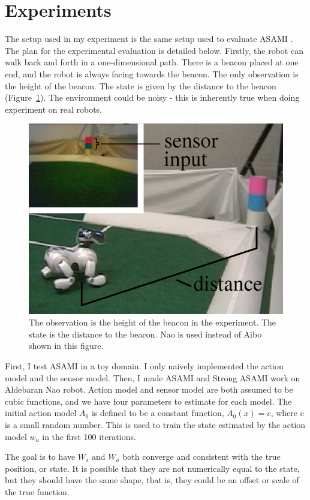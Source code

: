 \documentclass[12pt]{article}
\begin{document}
\section{Experiments}

The setup used in my experiment is the same setup used to evaluate
ASAMI \cite{CSJ06}. The
plan for the experimental evaluation is detailed below.
Firstly, the robot can walk back and forth in a one-dimensional path.
There is a beacon placed at one end, and the robot is always facing
towards the beacon. The only observation is the height of the beacon.
The state is given by the distance to the beacon
(Figure~\ref{fig:env}).  The environment could be noisy - this is
inherently true when doing experiment on real robots.

\begin{figure}
\centering
\includegraphics[width=0.6\columnwidth]{env.png}
\caption{The observation is the height of the beacon in the experiment.
The state is the distance to the beacon. Nao is used instead of Aibo
shown in this figure. \cite{CSJ06}}
\label{fig:env}
\end{figure}

First, I test ASAMI in a toy domain. I only naively implemented the action
model and the sensor model. Then, I made ASAMI and Strong ASAMI work on
Aldebaran Nao robot. Action model and sensor model are both assumed to be cubic
functions, and we have four parameters to estimate for each model. The
initial action model $A_0$ is defined to be a constant function,
$A_0(x) = c$, where c is a small random number. This is used to train
the state estimated by the action model $w_a$ in the first 100
iterations.

The goal is to have $W_s$ and $W_a$ both converge and consistent with
the true position, or state. It is possible that they are not
numerically equal to the state, but they should have the same shape,
that is, they could be an offset or scale of the true function.
\end{document}
